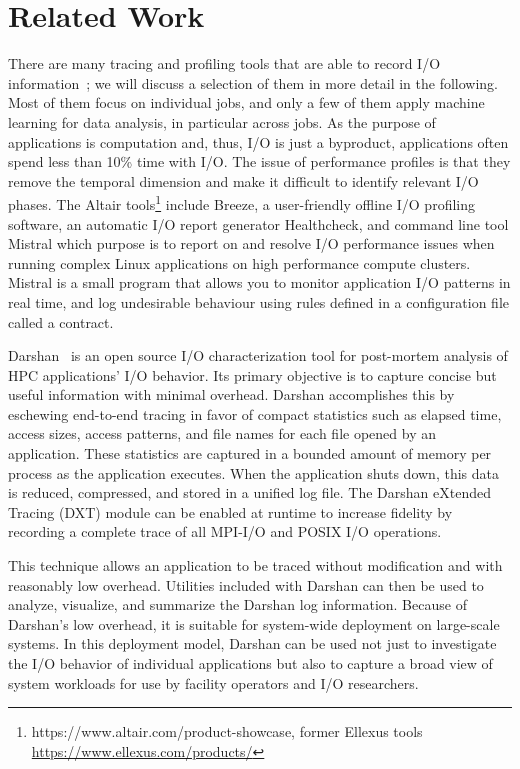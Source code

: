 \documentclass{jhps}
\begin{document}
\section{Related Work}%
\label{sec:rel_work}
There are many tracing and profiling tools that are able to record I/O information~\cite{TFAPIKBBCF19}; we will discuss a selection of them in more detail in the following.
Most of them focus on individual jobs, and only a few of them apply machine learning for data analysis, in particular across jobs.
As the purpose of applications is computation and, thus, I/O is just a byproduct, applications often spend less than 10\% time with I/O.
The issue of performance profiles is that they remove the temporal dimension and make it difficult to identify relevant I/O phases.
The Altair tools\footnote{https://www.altair.com/product-showcase, former Ellexus tools  \url{https://www.ellexus.com/products/}} include Breeze, a user-friendly offline I/O profiling software, an automatic I/O report generator Healthcheck, and command line tool Mistral which purpose is to report on and resolve I/O performance issues when running complex Linux applications on high performance compute clusters.
Mistral is a small program that allows you to monitor application I/O patterns in real time, and log undesirable behaviour using rules defined in a configuration file called a contract.

Darshan~\cite{carns2011understanding-toc,hpcdarshan} is an open source I/O characterization tool for post-mortem analysis of HPC applications' I/O behavior.
Its primary objective is to capture concise but useful information with minimal overhead.
Darshan accomplishes this by eschewing end-to-end tracing in favor of compact statistics such as elapsed time, access sizes, access patterns, and file names for each file opened by an application.
These statistics are captured in a bounded amount of memory per process as the application executes.
When the application shuts down, this data is reduced, compressed, and stored in a unified log file.
The Darshan eXtended Tracing (DXT) module can be enabled at runtime to increase fidelity by recording a complete trace of all MPI-I/O and POSIX I/O operations.

This technique allows an application to be traced without modification and with reasonably low overhead.
Utilities included with Darshan can then be used to analyze, visualize, and summarize the Darshan log information.
Because of Darshan's low overhead, it is suitable for system-wide deployment on large-scale systems.
In this deployment model, Darshan can be used not just to investigate the I/O behavior of individual applications but also to capture a broad view of system workloads for use by facility operators and I/O researchers.
\end{document}
